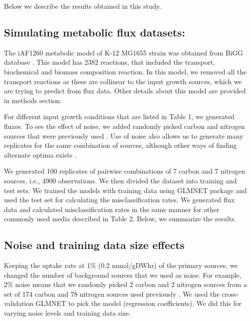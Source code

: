 \documentclass[12pt]{article}
\begin{document}
\noindent
Below we describe the results obtained in this study.

\subsection*{Simulating metabolic flux datasets:}
The iAF1260 metabolic model of K-12 MG1655 strain was obtained from BiGG database \cite{Schellenbergeretal2010}. This model has 2382 reactions, that included the transport, biochemical and biomass composition reaction. In this model, we removed all the transport reactions as these are collinear to the input growth sources, which we are trying to predict from flux data. Other details about this model are provided in methods section.

\bigskip
\noindent
For different input growth conditions that are listed in Table 1, we generated fluxes. To see the effect of noise, we added randomly picked carbon and nitrogen sources that were previously used \cite{Feistetal2007}. Use of noise also allows us to generate many replicates for the same combination of sources, although other ways of finding alternate optima exists \cite{MahadevanSchilling2003}.

\bigskip
\noindent
We generated 100 replicates of pairwise combinations of 7 carbon and 7 nitrogen sources, i.e., 4900 observations. We then divided the dataset into training and test sets. We trained the models with training data using GLMNET package and used the test set for calculating the misclassification rates. We generated flux data and calculated misclassification rates in the same manner for other commonly used media described in Table 2. Below, we summarize the results.

\bigskip
\subsection*{Noise and training data size effects}
Keeping the uptake rate at 1\% (0.2 mmol/gDWhr) of the primary sources, we changed the number of background sources that we used as noise. For example, 2\% noise means that we randomly picked 2 carbon and 2 nitrogen sources from a set of 174 carbon and 78 nitrogen sources used previously \cite{Feistetal2007}. We used the cross-validation GLMNET to pick the model (regression coefficients). We did this for varying noise levels and training data size.
\end{document}
